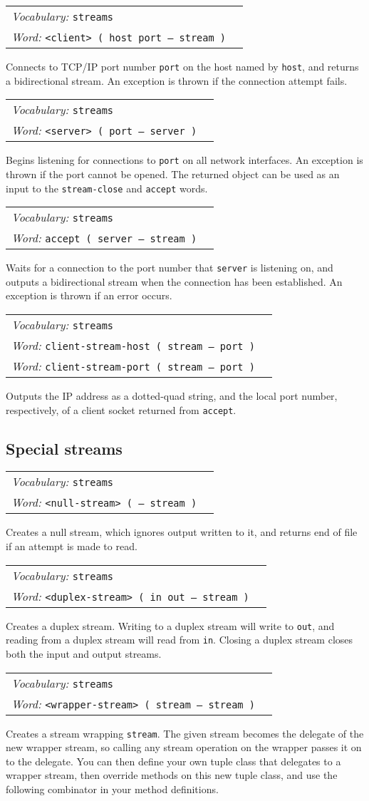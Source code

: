 \documentclass{book}
\newcommand{\vocabulary}[1]{\emph{Vocabulary:} \texttt{#1}&\\}
\newcommand{\ordinaryword}[2]{\index{\texttt{#1}}\emph{Word:} \texttt{#2}&\\}
\newcommand{\wordtable}[1]{

\begin{tabularx}{12cm}[t]{lX}
\hline
#1
\hline
\end{tabularx}

}
\begin{document}
\wordtable{
\vocabulary{streams}
\ordinaryword{<client>}{<client>~( host port -- stream~)}

}
Connects to TCP/IP port number \texttt{port} on the host named by \texttt{host}, and returns a bidirectional stream. An exception is thrown if the connection attempt fails.
\wordtable{
\vocabulary{streams}
\ordinaryword{<server>}{<server>~( port -- server~)}

}
Begins listening for connections to \texttt{port} on all network interfaces. An exception is thrown if the port cannot be opened. The returned object can be used as an input to the \texttt{stream-close} and \texttt{accept} words.
\wordtable{
\vocabulary{streams}
\ordinaryword{accept}{accept~( server -- stream~)}

}
Waits for a connection to the port number that \texttt{server} is listening on, and outputs a bidirectional stream when the connection has been established.  An exception is thrown if an error occurs.
\wordtable{
\vocabulary{streams}
\ordinaryword{client-stream-host}{client-stream-host~( stream -- port~)}
\ordinaryword{client-stream-port}{client-stream-port~( stream -- port~)}

}
Outputs the IP address as a dotted-quad string, and the local port number, respectively, of a client socket returned from \texttt{accept}.

\subsection{Special streams}


\wordtable{
\vocabulary{streams}
\ordinaryword{<null-stream>}{<null-stream>~( -- stream~)}
}
Creates a null stream, which ignores output written to it, and returns end of file if an attempt is made to read.
\wordtable{
\vocabulary{streams}
\ordinaryword{<duplex-stream>}{<duplex-stream>~( in out -- stream~)}
}
Creates a duplex stream. Writing to a duplex stream will write to \texttt{out}, and reading from a duplex stream will read from \texttt{in}. Closing a duplex stream closes both the input and output streams.
\wordtable{
\vocabulary{streams}
\ordinaryword{<wrapper-stream>}{<wrapper-stream>~( stream -- stream~)}
}
Creates a stream wrapping \texttt{stream}. The given stream becomes the delegate of the new wrapper stream, so calling any stream operation on the wrapper passes it on to the delegate.
You can then define your own tuple class that delegates to a wrapper stream, then override methods on this new tuple class, and use the following combinator in your method definitions.
\end{document}

